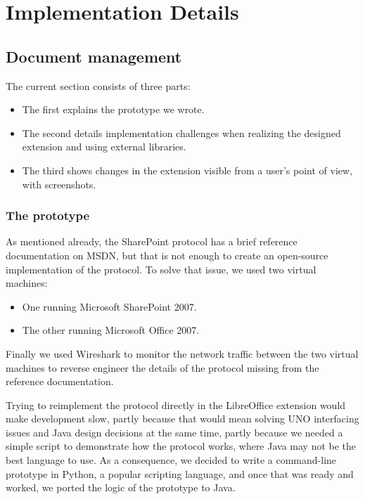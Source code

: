 \chapter{Implementation Details}

\section{Document management}

The current section consists of three parts:

\begin{itemize}
\item The first explains the prototype we wrote.
\item The second details implementation challenges when realizing the designed extension and using external libraries.
\item The third shows changes in the extension visible from a user's point of view, with screenshots.
\end{itemize}

\subsection{The prototype}

As mentioned already, the SharePoint protocol has a brief reference
documentation on MSDN, but that is not enough to create an open-source
implementation of the protocol. To solve that issue, we used two virtual
machines:

\begin{itemize}
\item One running Microsoft SharePoint 2007.
\item The other running Microsoft Office 2007.
\end{itemize}

Finally we used Wireshark \cite{wireshark} to monitor the network traffic
between the two virtual machines to reverse engineer the details of the
protocol missing from the reference documentation.

Trying to reimplement the protocol directly in the LibreOffice extension would
make development slow, partly because that would mean solving UNO interfacing
issues and Java design decisions at the same time, partly because we needed a
simple script to demonstrate how the protocol works, where Java may not be the
best language to use. As a consequence, we decided to write a command-line
prototype in Python, a popular scripting language, and once that was ready and
worked, we ported the logic of the prototype to Java.

